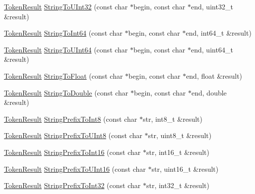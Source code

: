 \begin{DoxyCompactItemize}
\item 
\hyperlink{namespacemage_a2178ba2411db5912f41b2e7698c2037d}{Token\+Result} \hyperlink{namespacemage_ad84d36f8aaa4376d26b79a2fbd8fe22a}{String\+To\+U\+Int32} (const char $\ast$begin, const char $\ast$end, uint32\+\_\+t \&result)
\item 
\hyperlink{namespacemage_a2178ba2411db5912f41b2e7698c2037d}{Token\+Result} \hyperlink{namespacemage_a1e044f5c734c6597945b775100c45086}{String\+To\+Int64} (const char $\ast$begin, const char $\ast$end, int64\+\_\+t \&result)
\item 
\hyperlink{namespacemage_a2178ba2411db5912f41b2e7698c2037d}{Token\+Result} \hyperlink{namespacemage_a8e3b6a19a6ab9e7c905150352b8ab0ea}{String\+To\+U\+Int64} (const char $\ast$begin, const char $\ast$end, uint64\+\_\+t \&result)
\item 
\hyperlink{namespacemage_a2178ba2411db5912f41b2e7698c2037d}{Token\+Result} \hyperlink{namespacemage_a8610747ad641d27135bcd3a3d3c6b6c2}{String\+To\+Float} (const char $\ast$begin, const char $\ast$end, float \&result)
\item 
\hyperlink{namespacemage_a2178ba2411db5912f41b2e7698c2037d}{Token\+Result} \hyperlink{namespacemage_aaee12fa175aece0a6ffbaa8df4e63b60}{String\+To\+Double} (const char $\ast$begin, const char $\ast$end, double \&result)
\item 
\hyperlink{namespacemage_a2178ba2411db5912f41b2e7698c2037d}{Token\+Result} \hyperlink{namespacemage_ab2a4f965199e2efba23cbbd052a66283}{String\+Prefix\+To\+Int8} (const char $\ast$str, int8\+\_\+t \&result)
\item 
\hyperlink{namespacemage_a2178ba2411db5912f41b2e7698c2037d}{Token\+Result} \hyperlink{namespacemage_ace3c30c1b0e1eddafc8f14335223c46b}{String\+Prefix\+To\+U\+Int8} (const char $\ast$str, uint8\+\_\+t \&result)
\item 
\hyperlink{namespacemage_a2178ba2411db5912f41b2e7698c2037d}{Token\+Result} \hyperlink{namespacemage_a8ad9257753f5f5288f8e09b2c99e544e}{String\+Prefix\+To\+Int16} (const char $\ast$str, int16\+\_\+t \&result)
\item 
\hyperlink{namespacemage_a2178ba2411db5912f41b2e7698c2037d}{Token\+Result} \hyperlink{namespacemage_a59f623733dd4ad636de4cea46467da7d}{String\+Prefix\+To\+U\+Int16} (const char $\ast$str, uint16\+\_\+t \&result)
\item 
\hyperlink{namespacemage_a2178ba2411db5912f41b2e7698c2037d}{Token\+Result} \hyperlink{namespacemage_a6fbea19380a6886e4e84f45d86d3379f}{String\+Prefix\+To\+Int32} (const char $\ast$str, int32\+\_\+t \&result)

\end{DoxyCompactItemize}

